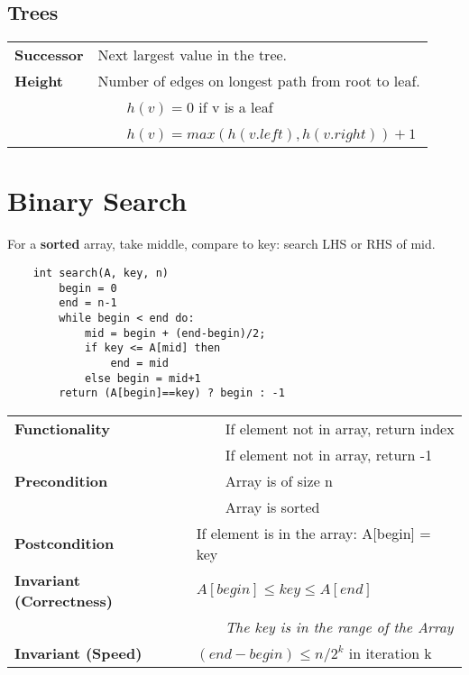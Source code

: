 \documentclass{article}
\newcommand{\tabitem}{~~\llap{\textbullet}~~}
\begin{document}
    \subsection{Trees}

    \begin{tabular}{ll}
        \textbf{Successor} & Next largest value in the tree.\\
        \textbf{Height} & Number of edges on longest path from root to leaf.\\
        & \tabitem $h(v) = 0$ if v is a leaf\\
        & \tabitem $h(v) = max(h(v.left), h(v.right)) + 1$\\
    \end{tabular}

    



    \pagebreak

    \section{Binary Search}
    For a \textbf{sorted }array, take middle, compare to key: search LHS or RHS of mid.

    \begin{verbatim}
    int search(A, key, n)
        begin = 0
        end = n-1
        while begin < end do:
            mid = begin + (end-begin)/2;
            if key <= A[mid] then
                end = mid
            else begin = mid+1
        return (A[begin]==key) ? begin : -1    
    \end{verbatim}


    \begin{tabular}{ll}
        \toprule
        \textbf{Functionality} & \tabitem If element not in array, return index\\
        & \tabitem If element not in array, return -1\\
        \midrule
        \textbf{Precondition} & \tabitem Array is of size n\\
        & \tabitem Array is sorted\\
        \midrule
        \textbf{Postcondition} & If element is in the array: A[begin] = key\\
        \midrule
        \textbf{Invariant (Correctness)} & $A[begin] \leq key \leq A[end]$ \\
        & \tabitem \emph{The key is in the range of the Array}\\
        \midrule
        \textbf{Invariant (Speed)} & $(end-begin) \leq n/2^{k}$ in iteration k \\
        \bottomrule
    \end{tabular}
\end{document}
